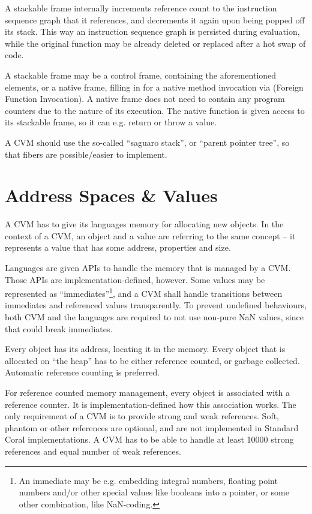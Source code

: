 A stackable frame internally increments reference count to the instruction sequence graph that it references, and decrements it again upon being popped off its stack. This way an instruction sequence graph is persisted during evaluation, while the original function may be already deleted or replaced after a hot swap of code. 

A stackable frame may be a control frame, containing the aforementioned elements, or a native frame, filling in for a native method invocation via  (Foreign Function Invocation). A native frame does not need to contain any program counters due to the nature of its execution. The native function is given access to its stackable frame, so it can e.g. return or throw a value. 

A CVM should use the so-called ``saguaro stack'', or ``parent pointer tree'', so that fibers are possible/easier to implement. 





\section{Address Spaces \& Values}

A CVM has to give its languages memory for allocating new objects. In the context of a CVM, an object and a value are referring to the same concept -- it represents a value that has some address, properties and size. 

Languages are given APIs to handle the memory that is managed by a CVM. Those APIs are implementation-defined, however. Some values may be represented as ``immediates''\footnote{An immediate may be e.g. embedding integral numbers, floating point numbers and/or other special values like booleans into a pointer, or some other combination, like NaN-coding.}, and a CVM shall handle transitions between immediates and referenced values transparently. To prevent undefined behaviours, both CVM and the languages are required to not use non-pure NaN values, since that could break immediates. 

Every object has its address, locating it in the memory. Every object that is allocated on ``the heap'' has to be either reference counted, or garbage collected. Automatic reference counting is preferred. 

For reference counted memory management, every object is associated with a reference counter. It is implementation-defined how this association works. The only requirement of a CVM is to provide strong and weak references. Soft, phantom or other references are optional, and are not implemented in Standard Coral implementations. A CVM has to be able to handle at least 10000 strong references and equal number of weak references. 

